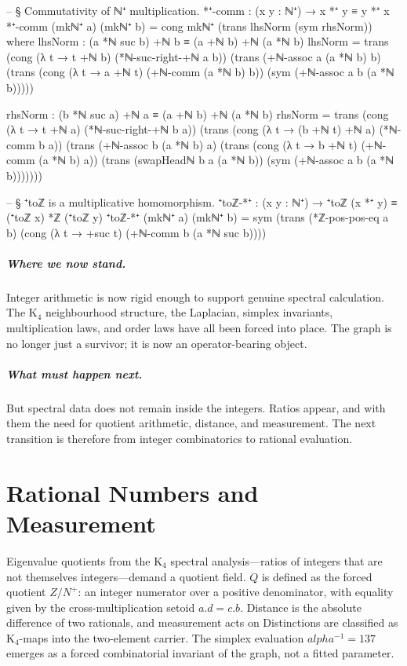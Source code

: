 \documentclass[11pt,a4paper]{book}
\def\alpha{alpha}%
\def\cdot{.}%
\def\mathbb#1{#1}%
\begin{document}
\begin{code}
-- § Commutativity of ℕ⁺ multiplication.
*⁺-comm : (x y : ℕ⁺) → x *⁺ y ≡ y *⁺ x
*⁺-comm (mkℕ⁺ a) (mkℕ⁺ b) =
  cong mkℕ⁺ (trans lhsNorm (sym rhsNorm))
  where
    lhsNorm : (a *ℕ suc b) +ℕ b ≡ (a +ℕ b) +ℕ (a *ℕ b)
    lhsNorm =
      trans
        (cong (λ t → t +ℕ b) (*ℕ-suc-right-+ℕ a b))
        (trans
          (+ℕ-assoc a (a *ℕ b) b)
          (trans
            (cong (λ t → a +ℕ t) (+ℕ-comm (a *ℕ b) b))
            (sym (+ℕ-assoc a b (a *ℕ b)))))

    rhsNorm : (b *ℕ suc a) +ℕ a ≡ (a +ℕ b) +ℕ (a *ℕ b)
    rhsNorm =
      trans
        (cong (λ t → t +ℕ a) (*ℕ-suc-right-+ℕ b a))
        (trans
          (cong (λ t → (b +ℕ t) +ℕ a) (*ℕ-comm b a))
          (trans
            (+ℕ-assoc b (a *ℕ b) a)
            (trans
              (cong (λ t → b +ℕ t) (+ℕ-comm (a *ℕ b) a))
              (trans
                (swapHeadℕ b a (a *ℕ b))
                (sym (+ℕ-assoc a b (a *ℕ b)))))))

-- § ⁺toℤ is a multiplicative homomorphism.
⁺toℤ-*⁺ : (x y : ℕ⁺) → ⁺toℤ (x *⁺ y) ≡ (⁺toℤ x) *ℤ (⁺toℤ y)
⁺toℤ-*⁺ (mkℕ⁺ a) (mkℕ⁺ b) =
  sym
    (trans
      (*ℤ-pos-pos-eq a b)
      (cong (λ t → +suc t) (+ℕ-comm b (a *ℕ suc b))))
\end{code}

\paragraph{Where we now stand.}
Integer arithmetic is now rigid enough to support genuine spectral calculation. The K$_4$ neighbourhood structure, the Laplacian, simplex invariants, multiplication laws, and order laws have all been forced into place. The graph is no longer just a survivor; it is now an operator-bearing object.

\paragraph{What must happen next.}
But spectral data does not remain inside the integers. Ratios appear, and with them the need for quotient arithmetic, distance, and measurement. The next transition is therefore from integer combinatorics to rational evaluation.

\chapter{Rational Numbers and Measurement}

Eigenvalue quotients from the K$_4$ spectral analysis---ratios of integers that are not themselves integers---demand a quotient field. $\mathbb{Q}$ is defined as the forced quotient $\mathbb{Z}/\mathbb{N}^+$: an integer numerator over a positive denominator, with equality given by the cross-multiplication setoid $a \cdot d = c \cdot b$. Distance is the absolute difference of two rationals, and measurement acts on Distinctions are classified as K$_4$-maps into the two-element carrier. The simplex evaluation $\alpha^{-1} = 137$ emerges as a forced combinatorial invariant of the graph, not a fitted parameter.
\end{document}
